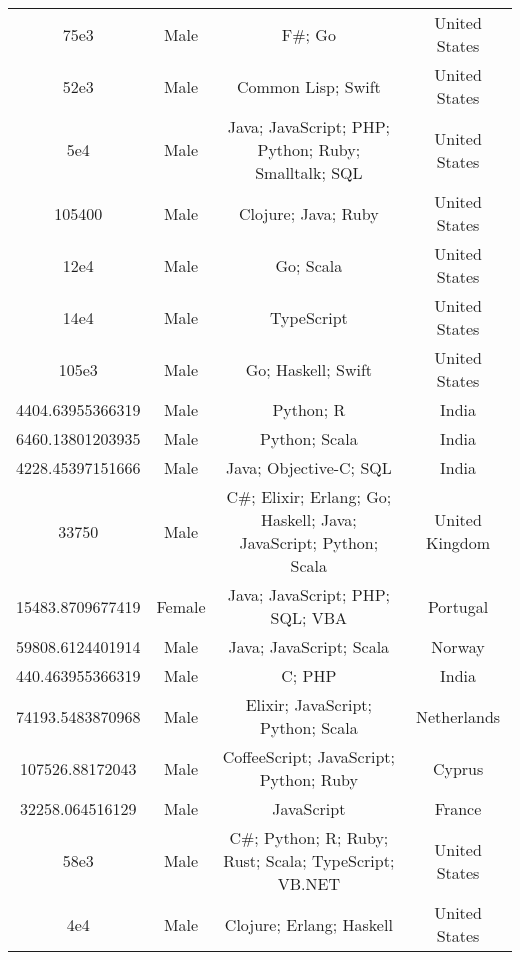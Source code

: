 \begin{center}
\begin{tabular}{ |c|c|c|c| }
75e3  &  Male  &  F\#; Go  &  United States  \\ 
52e3  &  Male  &  Common Lisp; Swift  &  United States  \\ 
5e4  &  Male  &  Java; JavaScript; PHP; Python; Ruby; Smalltalk; SQL  &  United States  \\ 
105400  &  Male  &  Clojure; Java; Ruby  &  United States  \\ 
12e4  &  Male  &  Go; Scala  &  United States  \\ 
14e4  &  Male  &  TypeScript  &  United States  \\ 
105e3  &  Male  &  Go; Haskell; Swift  &  United States  \\ 
4404.63955366319  &  Male  &  Python; R  &  India  \\ 
6460.13801203935  &  Male  &  Python; Scala  &  India  \\ 
4228.45397151666  &  Male  &  Java; Objective-C; SQL  &  India  \\ 
33750  &  Male  &  C\#; Elixir; Erlang; Go; Haskell; Java; JavaScript; Python; Scala  &  United Kingdom  \\ 
15483.8709677419  &  Female  &  Java; JavaScript; PHP; SQL; VBA  &  Portugal  \\ 
59808.6124401914  &  Male  &  Java; JavaScript; Scala  &  Norway  \\ 
440.463955366319  &  Male  &  C; PHP  &  India  \\ 
74193.5483870968  &  Male  &  Elixir; JavaScript; Python; Scala  &  Netherlands  \\ 
107526.88172043  &  Male  &  CoffeeScript; JavaScript; Python; Ruby  &  Cyprus  \\ 
32258.064516129  &  Male  &  JavaScript  &  France  \\ 
58e3  &  Male  &  C\#; Python; R; Ruby; Rust; Scala; TypeScript; VB.NET  &  United States  \\ 
4e4  &  Male  &  Clojure; Erlang; Haskell  &  United States  \\ 
\end{tabular}
\end{center}
